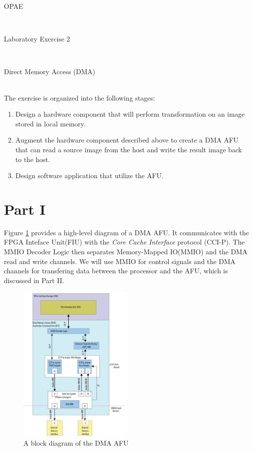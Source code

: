 \documentclass[epsfig,10pt,fullpage]{article}
\newcommand{\LabNum}{2}
\begin{document}
\centerline{\huge OPAE}
~\\
\centerline{\huge Laboratory Exercise \LabNum}
~\\
\centerline{\large Direct Memory Access (DMA)}
~\\

\noindent
The exercise is organized into the following stages:
\begin{enumerate}
    \item Design a hardware component that will perform transformation on an image stored in local memory.
    \item Augment the hardware component described above to create a DMA AFU that can read a source image from the host and write the result image back to the host.
    \item Design software application that utilize the AFU.
\end{enumerate}


\section*{Part I}

Figure \ref{fig:dmaAFU} provides a high-level diagram of a DMA AFU. It communicates with the FPGA Inteface Unit(FIU) with the \emph{Core Cache Interface} protocol (CCI-P). The MMIO Decoder Logic then separates Memory-Mapped IO(MMIO) and the DMA read and write channels. We will use MMIO for control signals and the DMA channels for transfering data between the processor and the AFU, which is discussed in Part II.\\

\begin{figure}[h]
    \centering
    \includegraphics[width=0.5\textwidth]{figures/DMAAFU.JPG}
    \caption{A block diagram of the DMA AFU}
    \label{fig:dmaAFU}
\end{figure}
\end{document}
